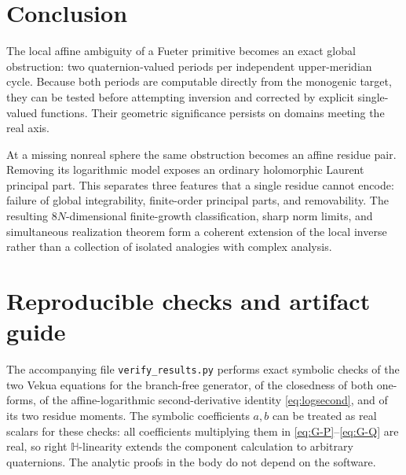\documentclass[11pt,a4paper]{article}
\numberwithin{equation}{section}
\theoremstyle{definition}
\theoremstyle{remark}
\newcommand{\HH}{\mathbb H}
\begin{document}
\section{Conclusion}
The local affine ambiguity of a Fueter primitive becomes an exact global
obstruction: two quaternion-valued periods per independent upper-meridian
cycle. Because both periods are computable directly from the monogenic
target, they can be tested before attempting inversion and corrected by
explicit single-valued functions. Their geometric significance persists on
domains meeting the real axis.

At a missing nonreal sphere the same obstruction becomes an affine residue
pair. Removing its logarithmic model exposes an ordinary holomorphic
Laurent principal part. This separates three features that a single residue
cannot encode: failure of global integrability, finite-order principal
parts, and removability. The resulting $8N$-dimensional finite-growth
classification, sharp norm limits, and simultaneous realization theorem
form a coherent extension of the local inverse rather than a collection of
isolated analogies with complex analysis.

\appendix
\section{Reproducible checks and artifact guide}
\label{app:checks}

The accompanying file \texttt{verify\_results.py} performs exact symbolic
checks of the two Vekua equations for the branch-free generator, of the
closedness of both one-forms, of the affine-logarithmic second-derivative
identity \eqref{eq:logsecond}, and of its two residue moments. The symbolic
coefficients $a,b$ can be treated as real scalars for these checks: all
coefficients multiplying them in \eqref{eq:G-P}--\eqref{eq:G-Q} are real,
so right $\HH$-linearity extends the component calculation to arbitrary
quaternions. The analytic proofs in the body do not depend on the software.
\end{document}

